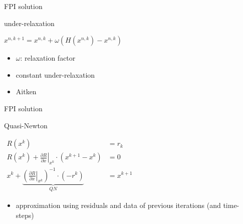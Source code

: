 \documentclass[10pt,t]{beamer}
\begin{document}
\begin{frame}{FPI solution}

  \begin{block}{under-relaxation}
  \begin{center}
  $x^{n,k+1} = x^{n,k} + \omega \left(H(x^{n,k}) - x^{n,k} \right)  $
      
  \end{center}
  \end{block}  
  
  \begin{itemize}
      \item $\omega$: relaxation factor
      \item constant under-relaxation
      \item Aitken
  \end{itemize}



\end{frame}


\begin{frame}{FPI solution}

  \begin{block}{Quasi-Newton}
  \begin{center}

  $
    \begin{aligned}
        R(x^k)&=r_k \\
        R(x^k) + \left. \frac{\partial R}{\partial x}\right|_{x^k} \cdot (x^{k+1} -x^k) &= 0 \\
        x^k +  \underbrace{ \left( \left. \frac{\partial R}{\partial x}\right|_{x^k}  \right)^{-1} \cdot (-r^k) }_{QN}   &=x^{k+1} 
    \end{aligned}
  $

  \end{center}
  \end{block}  
  
  \begin{itemize}
      \item approximation using residuals and data of previous iterations (and time-steps)
  \end{itemize}



\end{frame}
\end{document}
